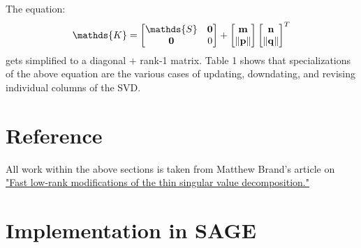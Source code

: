 \documentclass{article}
\begin{document}
\bigskip



The equation:
$$
\mathds{K}=
\begin{bmatrix}
\mathds{S} & \bf{0}\\
\bf{0} & 0
\end{bmatrix}
+
\begin{bmatrix}
\bf{m}\\
\|\bf{p}\|
\end{bmatrix}
\begin{bmatrix}
\bf{n}\\
\|\bf{q}\|
\end{bmatrix}^T
$$
gets simplified to a diagonal $+$ rank-1 matrix.
Table 1 shows that specializations of the above equation are the various cases of updating, downdating, and revising individual columns of the SVD.




\section{Reference\label{reference}}
All work within the above sections is taken from Matthew Brand's article on \href{http://www.stat.osu.edu/~dmsl/thinSVDtracking.pdf}{"Fast low-rank modifications of the thin singular value decomposition."}




\section{Implementation in SAGE\label{sage}}
\end{document}
